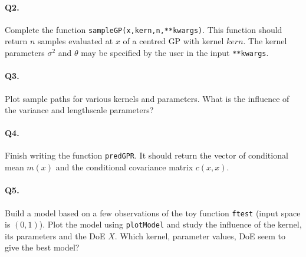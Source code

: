 \documentclass[12pt]{scrartcl}
\begin{document}
\paragraph{Q2.} Complete the function \texttt{sampleGP(x,kern,n,**kwargs)}. This function should return $n$ samples evaluated at $x$ of a centred GP with kernel $kern$. The kernel parameters $\sigma^2$ and $\theta$ may be specified by the user in the input \texttt{**kwargs}.

\paragraph{Q3.} Plot sample paths for various kernels and parameters. What is the influence of the variance and lengthscale parameters?

\paragraph{Q4.} Finish writing the function \texttt{predGPR}. It should return the vector of conditional mean $m(x)$ and the conditional covariance matrix $c(x,x)$.

\paragraph{Q5.} Build a model based on a few observations of the toy function \texttt{ftest} (input space is $(0,1)$). Plot the model using \texttt{plotModel} and study the influence of the kernel, its parameters and the DoE $X$. Which kernel, parameter values, DoE seem to give the best model?
\end{document}
